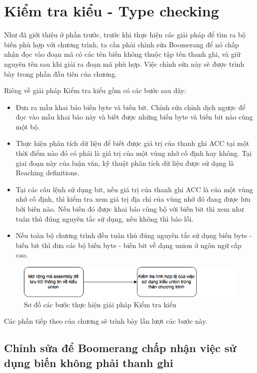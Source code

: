 \chapter{Kiểm tra kiểu - Type checking}
\label{chap:typechecking}
Như đã giới thiệu ở phần trước, trước khi thực hiện các giải pháp để tìm ra bộ biến phù hợp với chương trình, ta cần phải chỉnh sửa Boomerang để nó chấp nhận đọc vào đoạn mã có các tên biến không thuộc tập tên thanh ghi, và giữ nguyên tên sau khi giải ra đoạn mã phù hợp. Việc chỉnh sửa này sẽ được trình bày trong phần đầu tiên của chương.

Riêng về giải pháp Kiểm tra kiểu gồm có các bước sau đây:
\begin{itemize}
\item Đưa ra mẫu khai báo biến byte và biến bit. Chỉnh sửa chỉnh dịch ngược để đọc vào mẫu khai báo này và biết được những biến byte và biến bit nào cùng một bộ.
\item Thực hiện phân tích dữ liệu để biết được giá trị của thanh ghi ACC tại một thời điểm nào đó có phải là giá trị của một vùng nhớ cố định hay không. Tại giai đoạn này của luận văn, kỹ thuật phân tích dữ liệu được sử dụng là Reaching definitions.
\item Tại các câu lệnh sử dụng bit, nếu giá trị của thanh ghi ACC là của một vùng nhớ cố định, thì kiểm tra xem giá trị địa chỉ của vùng nhớ đó đang được lưu bởi biến nào. Nếu biến đó được khai báo cùng bộ với biến bit thì xem như tuân thủ đúng nguyên tắc sử dụng, nếu không thì báo lỗi.
\item Nếu toàn bộ chương trình đều tuân thủ đúng nguyên tắc sử dụng biến byte - biến bit thì đưa các bộ biến byte - biến bit về dạng union ở ngôn ngữ cấp cao.
\end{itemize}
\begin{figure}
	\centering
	\includegraphics[width=0.7\linewidth]{image/soDoTypeChecking}
	\caption{Sơ đồ các bước thực hiện giải pháp Kiểm tra kiểu}
	\label{fig:sodotypechecking}
\end{figure}

Các phần tiếp theo của chương sẽ trình bày lần lượt các bước này.

\section{Chỉnh sửa để Boomerang chấp nhận việc sử dụng biến không phải thanh ghi}
